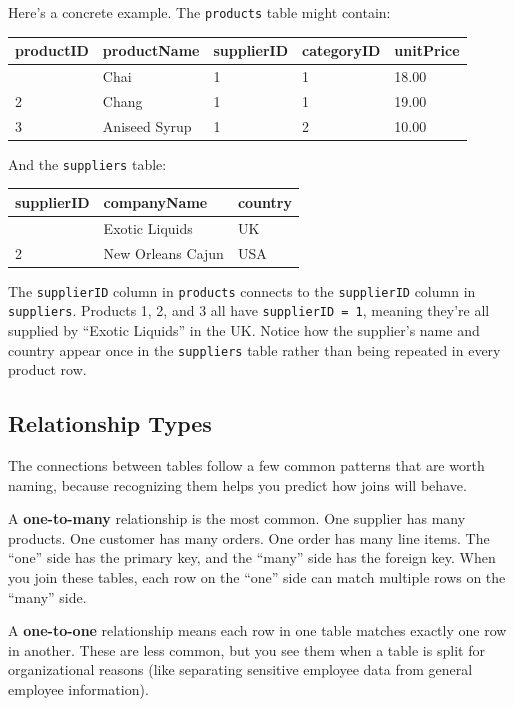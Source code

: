 \documentclass[
  letterpaper,
  DIV=11,
  numbers=noendperiod]{scrreprt}
\begin{document}
Here's a concrete example. The \texttt{products} table might contain:

\begin{longtable}[]{@{}lllll@{}}
\toprule\noalign{}
productID & productName & supplierID & categoryID & unitPrice \\
\midrule\noalign{}
\endhead
\bottomrule\noalign{}
\endlastfoot
1 & Chai & 1 & 1 & 18.00 \\
2 & Chang & 1 & 1 & 19.00 \\
3 & Aniseed Syrup & 1 & 2 & 10.00 \\
\end{longtable}

And the \texttt{suppliers} table:

\begin{longtable}[]{@{}lll@{}}
\toprule\noalign{}
supplierID & companyName & country \\
\midrule\noalign{}
\endhead
\bottomrule\noalign{}
\endlastfoot
1 & Exotic Liquids & UK \\
2 & New Orleans Cajun & USA \\
\end{longtable}

The \texttt{supplierID} column in \texttt{products} connects to the
\texttt{supplierID} column in \texttt{suppliers}. Products 1, 2, and 3
all have \texttt{supplierID\ =\ 1}, meaning they're all supplied by
``Exotic Liquids'' in the UK. Notice how the supplier's name and country
appear once in the \texttt{suppliers} table rather than being repeated
in every product row.

\subsection{Relationship Types}\label{relationship-types}

The connections between tables follow a few common patterns that are
worth naming, because recognizing them helps you predict how joins will
behave.

A \textbf{one-to-many} relationship is the most common. One supplier has
many products. One customer has many orders. One order has many line
items. The ``one'' side has the primary key, and the ``many'' side has
the foreign key. When you join these tables, each row on the ``one''
side can match multiple rows on the ``many'' side.

A \textbf{one-to-one} relationship means each row in one table matches
exactly one row in another. These are less common, but you see them when
a table is split for organizational reasons (like separating sensitive
employee data from general employee information).
\end{document}
